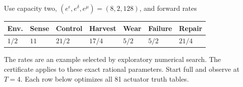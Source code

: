 \documentclass[
  11pt,
]{article}
\newcounter{none} %
\begin{document}
Use capacity two, \((e^\epsilon,e^\delta,e^\mu)=(8,2,128)\), and forward
rates

{\def\LTcaptype{none} %
\begin{longtable}[]{@{}
  >{\raggedleft\arraybackslash}p{}
  >{\raggedleft\arraybackslash}p{}
  >{\raggedleft\arraybackslash}p{}
  >{\raggedleft\arraybackslash}p{}
  >{\raggedleft\arraybackslash}p{}
  >{\raggedleft\arraybackslash}p{}
  >{\raggedleft\arraybackslash}p{}@{}}
\toprule\noalign{}
\begin{minipage}[b]{\linewidth}\raggedleft
Env.
\end{minipage} & \begin{minipage}[b]{\linewidth}\raggedleft
Sense
\end{minipage} & \begin{minipage}[b]{\linewidth}\raggedleft
Control
\end{minipage} & \begin{minipage}[b]{\linewidth}\raggedleft
Harvest
\end{minipage} & \begin{minipage}[b]{\linewidth}\raggedleft
Wear
\end{minipage} & \begin{minipage}[b]{\linewidth}\raggedleft
Failure
\end{minipage} & \begin{minipage}[b]{\linewidth}\raggedleft
Repair
\end{minipage} \\
\midrule\noalign{}
\endhead
\bottomrule\noalign{}
\endlastfoot
\(1/2\) & \(11\) & \(21/2\) & \(17/4\) & \(5/2\) & \(5/2\) & \(21/4\) \\
\end{longtable}
}

The rates are an example selected by exploratory numerical search. The
certificate applies to these exact rational parameters. Start full and
observe at \(T=4\). Each row below optimizes all 81 actuator truth
tables.
\end{document}
